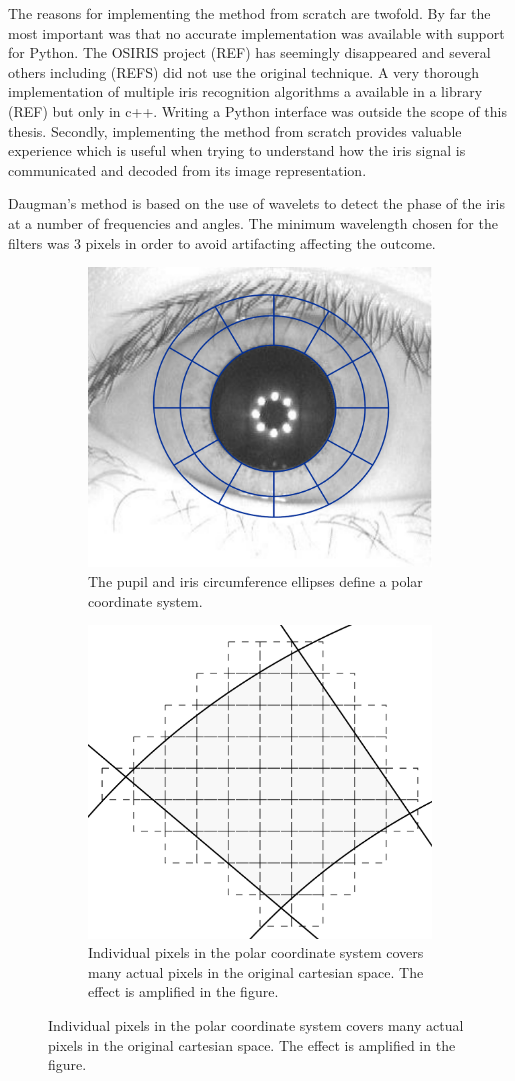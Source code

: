 The reasons for implementing the method from scratch are twofold. By far the most important was that no accurate implementation was available with support for Python. The OSIRIS project (REF) has seemingly disappeared and several others including (REFS) did not use the original technique. A very thorough implementation of multiple iris recognition algorithms a available in a library (REF) but only in c++. Writing a Python interface was outside the scope of this thesis. Secondly, implementing the method from scratch provides valuable experience which is useful when trying to understand how the iris signal is communicated and decoded from its image representation.


Daugman's method is based on the use of wavelets to detect the phase of the iris at a number of frequencies and angles. The minimum wavelength chosen for the filters was 3 pixels in order to avoid artifacting affecting the outcome.

\begin{figure}
    \begin{subfigure}{0.5\linewidth}
        \centering
        \includegraphics[width=0.6\linewidth]{figures/polar-image.pdf}
        \caption{The pupil and iris circumference ellipses define a polar coordinate system.}
        \label{fig:polar-method}
    \end{subfigure}
    \begin{subfigure}{0.5\linewidth}
        \centering
        \includegraphics[width=0.6\linewidth]{figures/polar-method.pdf}
        \caption{Individual pixels in the polar coordinate system covers many actual pixels in the original cartesian space. The effect is amplified in the figure.}
        \label{fig:polar-method}
    \end{subfigure}
\end{figure}

